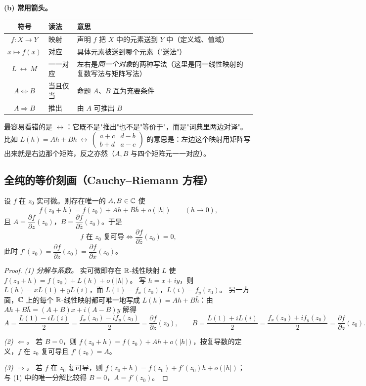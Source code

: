 \medskip
\noindent\textbf{(b) 常用箭头。}
\begin{center}
\renewcommand{\arraystretch}{1.3}
\begin{tabular}{|c|l|p{}|}
\hline
符号 & 读法 & 意思\\
\hline
$f:X\to Y$ & 映射 & 声明 $f$ 把 $X$ 中的元素送到 $Y$ 中（定义域、值域）\\
\hline
$x\mapsto f(x)$ & 对应 & 具体元素被送到哪个元素（"送法"）\\
\hline
$L\ \longleftrightarrow\ M$ & 一一对应 & 左右是\emph{同一个对象}的两种写法（这里是同一线性映射的复数写法与矩阵写法）\\
\hline
$A\iff B$ & 当且仅当 & 命题 $A$、$B$ 互为充要条件\\
\hline
$A\Rightarrow B$ & 推出 & 由 $A$ 可推出 $B$\\
\hline
\end{tabular}
\end{center}

\noindent
最容易看错的是 $\longleftrightarrow$：它既不是"推出"也不是"等价于"，而是"词典里两边对译"。
比如 $L(h)=Ah+B\bar h\ \longleftrightarrow\ \begin{pmatrix}a+c&d-b\\ b+d&a-c\end{pmatrix}$
的意思是：左边这个映射用矩阵写出来就是右边那个矩阵，反之亦然（$A,B$ 与四个矩阵元一一对应）。

\subsection{全纯的等价刻画（Cauchy--Riemann 方程）}

\begin{proposition}\label{prop:pointwise}
设 $f$ 在 $z_0$ 实可微。则存在唯一的 $A,B\in\mathbb{C}$ 使
\[
f(z_0+h)=f(z_0)+Ah+B\bar h+o(|h|)\qquad (h\to 0),
\]
且 $A=\dfrac{\partial f}{\partial z}(z_0)$，$B=\dfrac{\partial f}{\partial\bar z}(z_0)$。于是
\[
f \text{ 在 } z_0 \text{ 复可导}\iff \frac{\partial f}{\partial\bar z}(z_0)=0,
\]
此时 $f'(z_0)=\dfrac{\partial f}{\partial z}(z_0)=\dfrac{\partial f}{\partial x}(z_0)$。
\end{proposition}

\begin{proof}
\emph{(1) 分解与系数。} 实可微即存在 $\mathbb{R}$-线性映射 $L$ 使 $f(z_0+h)=f(z_0)+L(h)+o(|h|)$。
写 $h=x+iy$，则 $L(h)=xL(1)+yL(i)$，而 $L(1)=f_x(z_0)$，$L(i)=f_y(z_0)$。
另一方面，$\mathbb{C}$ 上的每个 $\mathbb{R}$-线性映射都可唯一地写成 $L(h)=Ah+B\bar h$：由
$Ah+B\bar h=(A+B)x+i(A-B)y$ 解得
\[
A=\frac{L(1)-iL(i)}{2}=\frac{f_x(z_0)-if_y(z_0)}{2}=\frac{\partial f}{\partial z}(z_0),
\qquad
B=\frac{L(1)+iL(i)}{2}=\frac{f_x(z_0)+if_y(z_0)}{2}=\frac{\partial f}{\partial \bar z}(z_0).
\]

\emph{(2) $\Leftarrow$。} 若 $B=0$，则 $f(z_0+h)=f(z_0)+Ah+o(|h|)$，按复导数的定义，$f$ 在 $z_0$ 复可导且 $f'(z_0)=A$。

\emph{(3) $\Rightarrow$。} 若 $f$ 在 $z_0$ 复可导，则 $f(z_0+h)=f(z_0)+f'(z_0)h+o(|h|)$；
与 (1) 中的唯一分解比较得 $B=0$，$A=f'(z_0)$。
\end{proof}

